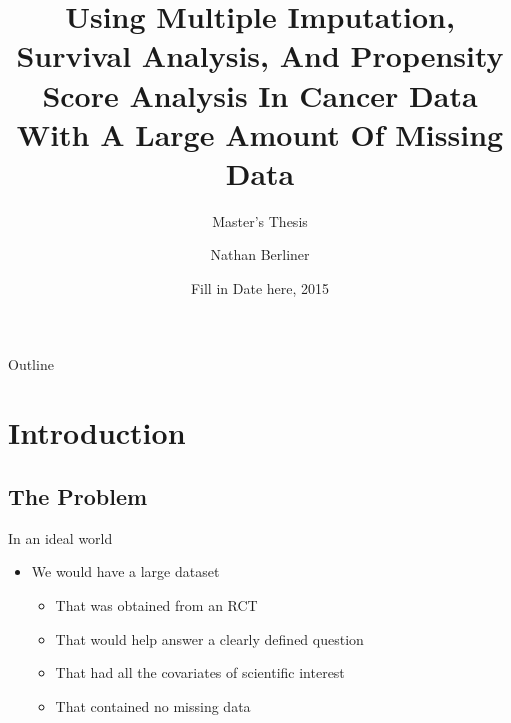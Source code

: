 \documentclass{beamer}
\title[Master's Thesis]{Using Multiple Imputation, Survival Analysis, 
And Propensity Score Analysis In Cancer Data With A Large Amount Of Missing Data}
\subtitle{Master's Thesis}
\author{Nathan Berliner \inst{1}}
\institute[Rice] %
{
  \inst{1}%
  Department of Statistics\\
  Rice University
  }
\date{Fill in Date here, 2015}
\begin{document}
\begin{frame}
  \titlepage
\end{frame}

\begin{frame}{Outline}
  \tableofcontents
\end{frame}

\section{Introduction}
\subsection{The Problem}


\begin{frame}{In an ideal world}
  \begin{itemize}
  \item We would have a large dataset
  \begin{itemize}
   \item That was obtained from an RCT
   \item That would help answer a clearly defined question
   \item That had all the covariates of scientific interest
   \item That contained no missing data
  \end{itemize}

  \end{itemize}
\end{frame}
\end{document}
